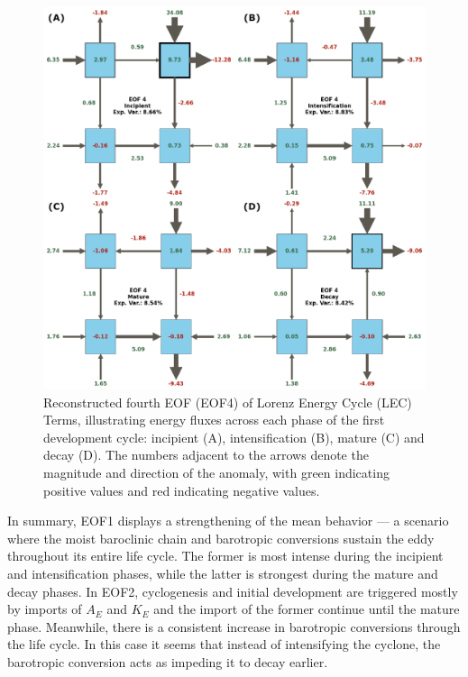\begin{figure}[!htbp]
\centering
\includegraphics[width=\textwidth]{figs_5/eof4_phases_reconstructed.pdf}
\caption[Reconstructed EOF4 - Phases]{Reconstructed fourth EOF (EOF4) of Lorenz Energy Cycle (LEC) Terms, illustrating energy fluxes across each phase of the first development cycle: incipient (A), intensification (B), mature (C) and decay (D).  The numbers adjacent to the arrows denote the magnitude and direction of the anomaly, with green indicating positive values and red indicating negative values.}
\label{fig:eof4_phases}
\end{figure}

In summary, EOF1 displays a strengthening of the mean behavior — a scenario where the moist baroclinic chain and barotropic conversions sustain the eddy throughout its entire life cycle. The former is most intense during the incipient and intensification phases, while the latter is strongest during the mature and decay phases. In EOF2, cyclogenesis and initial development are triggered mostly by imports of $A_E$ and $K_E$ and the import of the former continue until the mature phase. Meanwhile, there is a consistent increase in barotropic conversions through the life cycle. In this case it seems that instead of intensifying the cyclone, the barotropic conversion acts as impeding it to decay earlier.  

